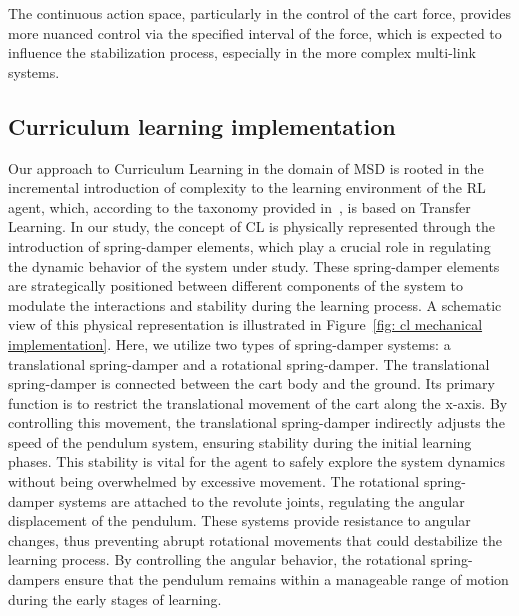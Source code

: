 The continuous action space, particularly in the control of the cart force, provides more nuanced control via the specified interval of the force, which is expected to influence the stabilization process, especially in the more complex multi-link systems.

\subsection{Curriculum learning implementation} \label{subsec: Curriculum learning implementation}
Our approach to Curriculum Learning in the domain of MSD is rooted in the incremental introduction of complexity to the learning environment of the RL agent, which, according to the taxonomy provided in~\cite{narvekar2020survey}, is based on Transfer Learning.
In our study, the concept of CL is physically represented through the introduction of spring-damper elements, which play a crucial role in regulating the dynamic behavior of the system under study. These spring-damper elements are strategically positioned between different components of the system to modulate the interactions and stability during the learning process. A schematic view of this physical representation is illustrated in Figure~\ref{fig: cl mechanical implementation}. Here, we utilize two types of spring-damper systems: a translational spring-damper and a rotational spring-damper. The translational spring-damper is connected between the cart body and the ground. Its primary function is to restrict the translational movement of the cart along the x-axis. By controlling this movement, the translational spring-damper indirectly adjusts the speed of the pendulum system, ensuring stability during the initial learning phases. This stability is vital for the agent to safely explore the system dynamics without being overwhelmed by excessive movement. The rotational spring-damper systems are attached to the revolute joints, regulating the angular displacement of the pendulum. These systems provide resistance to angular changes, thus preventing abrupt rotational movements that could destabilize the learning process. By controlling the angular behavior, the rotational spring-dampers ensure that the pendulum remains within a manageable range of motion during the early stages of learning.

